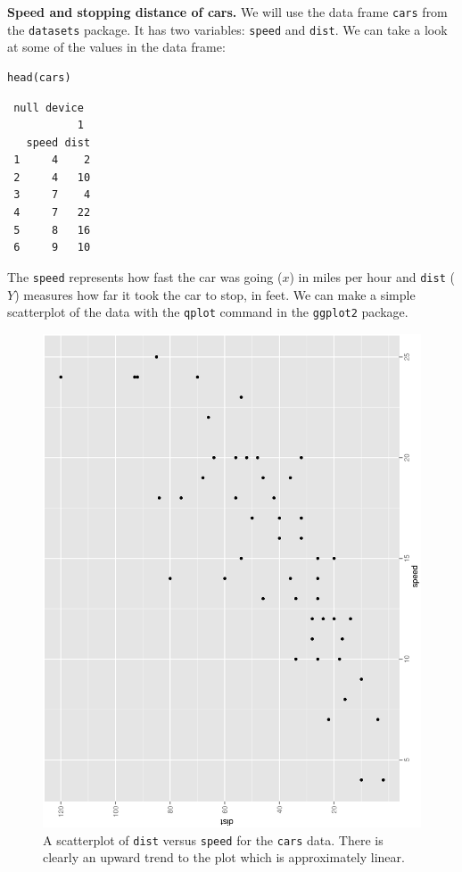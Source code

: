 \documentclass[captions=tableheading]{scrbook}
\begin{document}
\begin{example}
\label{exa:Speed-and-Stopping}
\textbf{Speed and stopping distance of cars.} We will use the data frame \texttt{cars} from the \texttt{datasets} package. It has two variables: \texttt{speed} and \texttt{dist}. We can take a look at some of the values in the data frame: 

\begin{verbatim}
head(cars)
\end{verbatim}

\begin{verbatim}
 null device 
           1
   speed dist
 1     4    2
 2     4   10
 3     7    4
 4     7   22
 5     8   16
 6     9   10
\end{verbatim}

The \texttt{speed} represents how fast the car was going (\(x\)) in miles per hour and \texttt{dist} (\(Y\)) measures how far it took the car to stop, in feet. We can make a simple scatterplot of the data with the \texttt{qplot} command in the \texttt{ggplot2} package. 

\begin{figure}[th]
  \includegraphics[angle=270, totalheight=4in]{img/carscatter.ps}
  \caption[Scatterplot of \texttt{dist} versus \texttt{speed} for the \texttt{cars} data]{\small A scatterplot of \texttt{dist} versus \texttt{speed} for the \texttt{cars} data.  There is clearly an upward trend to the plot which is approximately linear.}
  \label{fig:Scatter-cars}
\end{figure}



\end{example}
\end{document}
